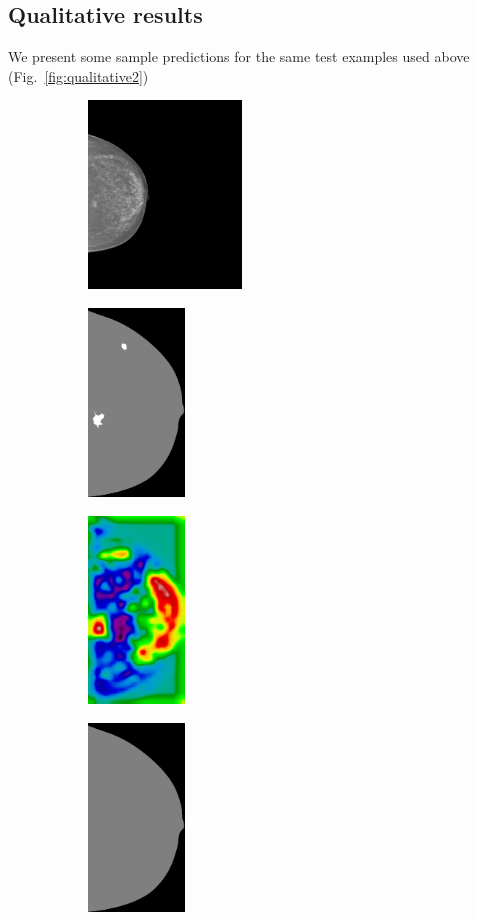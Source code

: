 \subsection{Qualitative results}
We present some sample predictions for the same test examples used above (Fig.~\ref{fig:qualitative2})
\begin{figure}[h]
\centering
	\begin{subfigure}{0.25\textwidth}
		\centering
			\includegraphics[height = 5cm]{plots/mammogram_ex1.png}
	\end{subfigure}
	\begin{subfigure}{0.2\textwidth}
		\centering
			\includegraphics[height = 5cm]{plots/label_ex1.png}
	\end{subfigure}
	\begin{subfigure}{0.16\textwidth}
		\centering
			\includegraphics[height = 5cm]{plots/logits_ex1_v2.png}
	\end{subfigure}
	\begin{subfigure}{0.2\textwidth}
		\centering
			\includegraphics[height = 5cm]{plots/segmentation_ex1_v2.png}

\end{subfigure}
\end{figure}
